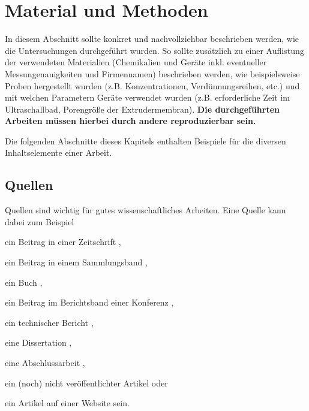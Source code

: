 
\chapter{Material und Methoden}
\label{chapter:material-methoden}

In diesem Abschnitt sollte konkret und nachvollziehbar beschrieben werden, wie die Untersuchungen durchgeführt wurden. So sollte zusätzlich zu einer Auflistung der verwendeten Materialien (Chemikalien und Geräte inkl. eventueller Messungenauigkeiten und Firmennamen) beschrieben werden, wie beispielsweise Proben hergestellt wurden (z.B. Konzentrationen, Verdünnungsreihen, etc.) und mit welchen Parametern Geräte verwendet wurden (z.B. erforderliche Zeit im Ultraschallbad, Porengröße der Extrudermembran). \textbf{Die durchgeführten  Arbeiten müssen hierbei durch andere reproduzierbar sein.}

Die folgenden Abschnitte dieses Kapitels enthalten Beispiele für die diversen Inhaltselemente einer Arbeit.


\section{Quellen}

Quellen sind wichtig für gutes wissenschaftliches Arbeiten. Eine Quelle kann dabei zum Beispiel
\begin{compactitem}
  \item ein Beitrag in einer Zeitschrift \cite{MopOverview},
  \item ein Beitrag in einem Sammlungsband \cite{moore},
  \item ein Buch \cite{scala},
  \item ein Beitrag im Berichtsband einer Konferenz \cite{rltl},
  \item ein technischer Bericht \cite{bitkom},
  \item eine Dissertation \cite{Leucker02},
  \item eine Abschlussarbeit \cite{RltlConv},
  \item ein (noch) nicht veröffentlichter Artikel \cite{ptLTL} oder
  \item ein Artikel auf einer Website \cite{codecommit} sein.
\end{compactitem}

